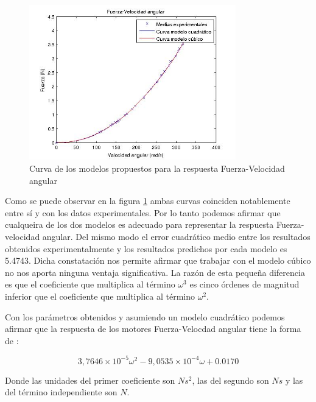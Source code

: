 \documentclass[spanish,12pt,a4paper,titlepage]{report}
\begin{document}
\begin{figure}
  \vspace{-20pt}
  \begin{center}
    \includegraphics[width=0.8\textwidth]{./Pics/modsfvel.jpg}
  \end{center}
  \vspace{-20pt}
  \caption{Curva de los modelos propuestos para la respuesta Fuerza-Velocidad angular}
  \label{fig:grafica2}
  \vspace{-10pt}
\end{figure}



Como se puede observar en la figura \ref{fig:grafica2} ambas curvas coinciden notablemente entre sí y con los datos experimentales. Por lo tanto podemos afirmar que cualqueira de los dos modelos es adecuado para representar la respuesta Fuerza-velocidad angular. Del mismo modo el error cuadrático medio entre los resultados obtenidos experimentalmente y los resultados predichos por cada modelo es 5.4743. Dicha constatación nos permite afirmar que trabajar con el modelo cúbico no nos aporta ninguna ventaja significativa. La razón de esta pequeña diferencia es que el coeficiente que multiplica al término $\omega^3$ es cinco órdenes de magnitud inferior que el coeficiente que multiplica al término $\omega^2$. 


Con los parámetros obtenidos y asumiendo un modelo cuadrático podemos afirmar que la respuesta de los motores Fuerza-Velocdad angular tiene la forma de :

\begin{equation}
3,7646 \times 10^{-5}\omega ^2 - 9,0535 \times 10^{-4}\omega +0.0170
\end{equation}

Donde las unidades del primer coeficiente son $Ns^2$, las del segundo son $Ns$ y las del término independiente son $N$.
\end{document}
